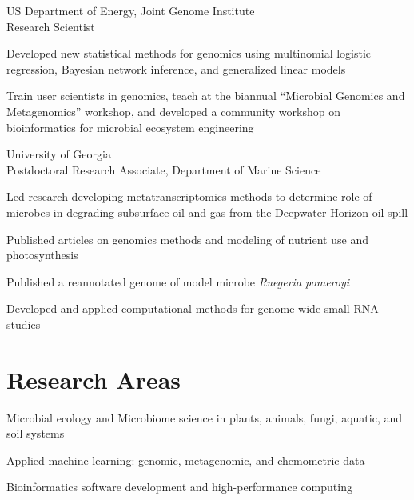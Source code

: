 \documentclass[12pt,letterpaper]{report}
\newcommand{\listitemspace}{0.15em}
\renewenvironment{itemize}
{\begin{list}{}{\setlength{\leftmargin}{0em}
            \setlength{\parskip}{0em}
            \setlength{\itemsep}{\listitemspace}
            \setlength{\parsep}{\listitemspace}}}
    {\end{list}}
\begin{document}
\begin{tablist}
        \item[2014--16] \tab US Department of Energy, Joint Genome Institute \\
                             Research Scientist  \\
                             \tab \begin{itemize}
                             	\item[$\bullet$]  Developed new statistical methods for genomics using multinomial logistic regression,  Bayesian network 								inference, and generalized linear models
				\item[$\bullet$]  Train user scientists in genomics, teach at the biannual “Microbial Genomics and Metagenomics” workshop, and 							developed a community workshop on bioinformatics for microbial ecosystem engineering
				\end{itemize}
        \item[2009--14] \tab University of Georgia \\
                             Postdoctoral Research Associate, Department of Marine Science
                                   \tab \begin{itemize}
                             	\item[$\bullet$]  Led research developing metatranscriptomics methods to determine role of microbes
in degrading subsurface oil and gas from the Deepwater Horizon oil spill
				\item[$\bullet$]  Published articles on genomics methods and modeling of nutrient use and
photosynthesis
				\item[$\bullet$] Published a reannotated
genome of model microbe \emph{Ruegeria pomeroyi}
				\item[$\bullet$] Developed and applied computational methods for genome-wide small RNA studies
				\end{itemize}
                             
		  

    \end{tablist}

    \section*{Research Areas}

    \begin{itemize}

        \item Microbial ecology and Microbiome science in plants, animals, fungi, aquatic, and soil systems

        \item Applied machine learning: genomic, metagenomic, and chemometric data 

        \item Bioinformatics software development and high-performance computing

    \end{itemize}
\end{document}
